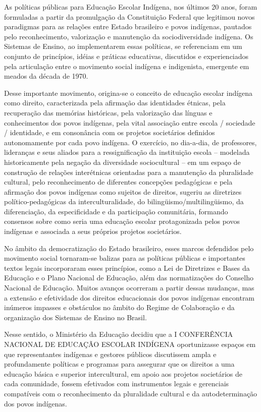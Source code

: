 \documentclass[
]{book}
\begin{document}
As políticas públicas para Educação Escolar Indígena, nos últimos 20 anos, foram formuladas a partir da promulgação da Constituição Federal que legitimou novos paradigmas para as relações entre Estado brasileiro e povos indígenas, pautados pelo reconhecimento, valorização e manutenção da sociodiversidade indígena. Os Sistemas de Ensino, ao implementarem essas políticas, se referenciam em um conjunto de princípios, idéias e práticas educativas, discutidos e experienciados pela articulação entre o movimento social indígena e indigenista, emergente em meados da década de 1970.

Desse importante movimento, origina-se o conceito de educação escolar indígena como direito, caracterizada pela afirmação das identidades étnicas, pela recuperação das memórias históricas, pela valorização das línguas e conhecimentos dos povos indígenas, pela vital associação entre escola / sociedade / identidade, e em consonância com os projetos societários definidos autonomamente por cada povo indígena. O exercício, no dia-a-dia, de professores, lideranças e seus aliados para a ressignificação da instituição escola -- modelada historicamente pela negação da diversidade sociocultural -- em um espaço de construção de relações interétnicas orientadas para a manutenção da pluralidade cultural, pelo reconhecimento de diferentes concepções pedagógicas e pela afirmação dos povos indígenas como sujeitos de direitos, sugeriu as diretrizes político-pedagógicas da interculturalidade, do bilingüismo/multilingüismo, da diferenciação, da especificidade e da participação comunitária, formando consensos sobre como seria uma educação escolar protagonizada pelos povos indígenas e associada a seus próprios projetos societários.

No âmbito da democratização do Estado brasileiro, esses marcos defendidos pelo movimento social tornaram-se balizas para as políticas públicas e importantes textos legais incorporaram esses princípios, como a Lei de Diretrizes e Bases da Educação e o Plano Nacional de Educação, além das normatizações do Conselho Nacional de Educação. Muitos avanços ocorreram a partir dessas mudanças, mas a extensão e efetividade dos direitos educacionais dos povos indígenas encontram inúmeros impasses e obstáculos no âmbito do Regime de Colaboração e da organização dos Sistemas de Ensino no Brasil.

Nesse sentido, o Ministério da Educação decidiu que a I CONFERÊNCIA NACIONAL DE EDUCAÇÃO ESCOLAR INDÍGENA oportunizasse espaços em que representantes indígenas e gestores públicos discutissem ampla e profundamente políticas e programas para assegurar que os direitos a uma educação básica e superior intercultural, em apoio aos projetos societários de cada comunidade, fossem efetivados com instrumentos legais e gerenciais compatíveis com o reconhecimento da pluralidade cultural e da autodeterminação dos povos indígenas.
\end{document}
